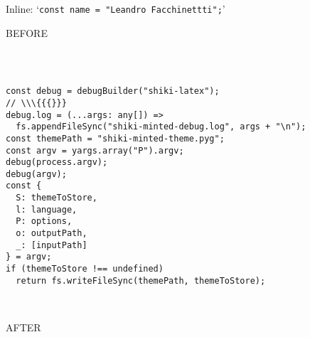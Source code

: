 \documentclass{article}
\begin{document}
Inline: ‘\texttt{const name = "Leandro Facchinettti";}’

BEFORE
\begin{verbatim}



const debug = debugBuilder("shiki-latex");
// \\\{{{}}}
debug.log = (...args: any[]) =>
  fs.appendFileSync("shiki-minted-debug.log", args + "\n");
const themePath = "shiki-minted-theme.pyg";
const argv = yargs.array("P").argv;
debug(process.argv);
debug(argv);
const {
  S: themeToStore,
  l: language,
  P: options,
  o: outputPath,
  _: [inputPath]
} = argv;
if (themeToStore !== undefined)
  return fs.writeFileSync(themePath, themeToStore);



\end{verbatim}
AFTER
\end{document}
